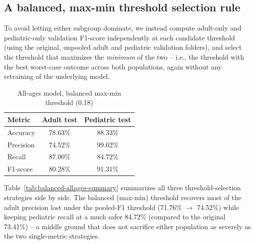 \documentclass[conference]{IEEEtran}
\begin{document}
\subsection{A balanced, max-min threshold selection rule}

To avoid letting either subgroup dominate, we instead compute adult-only and
pediatric-only validation F1-score independently at each candidate
threshold (using the original, unpooled adult and pediatric validation
folders), and select the threshold that maximizes the \emph{minimum} of the
two -- i.e., the threshold with the best worst-case outcome across both
populations, again without any retraining of the underlying model.

\begin{table}[htbp]
\caption{All-ages model, balanced max-min threshold (0.18)}
\begin{center}
\begin{tabular}{lcc}
\toprule
\textbf{Metric} & \textbf{Adult test} & \textbf{Pediatric test} \\
\midrule
Accuracy  & 78.63\% & 88.33\% \\
Precision & 74.52\% & 99.02\% \\
Recall    & 87.00\% & 84.72\% \\
F1-score  & 80.28\% & 91.31\% \\
\bottomrule
\end{tabular}
\label{tab:balanced-allages}
\end{center}
\end{table}

Table~\ref{tab:balanced-allages-summary} summarizes all three
threshold-selection strategies side by side. The balanced (max-min)
threshold recovers most of the adult precision lost under the pooled-F1
threshold (71.76\% $\rightarrow$ 74.52\%) while keeping pediatric recall at
a much safer 84.72\% (compared to the original 73.41\%) -- a middle ground
that does not sacrifice either population as severely as the two single-metric
strategies.
\end{document}
